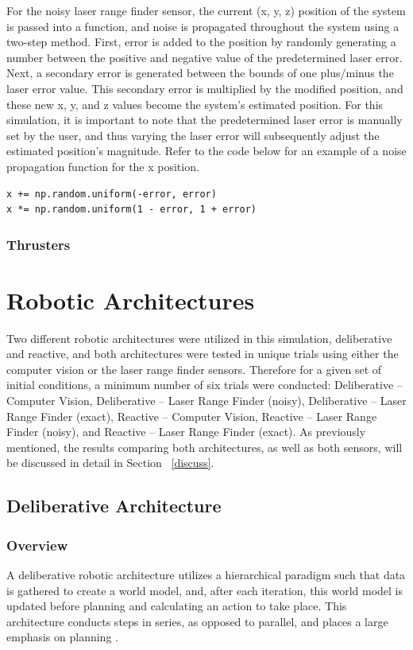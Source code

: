 \documentclass[journal, 10pt]{IEEEtran}
\begin{document}
For the noisy laser range finder sensor, the current (x, y, z) position of the system is passed into a function, and noise is propagated throughout the system using a two-step method. First, error is added to the position by randomly generating a number between the positive and negative value of the predetermined laser error. Next, a secondary error is generated between the bounds of one plus/minus the laser error value. This secondary error is multiplied by the modified position, and these new x, y, and z values become the system's estimated position.  For this simulation, it is important to note that the predetermined laser error is manually set by the user, and thus varying the laser error will subsequently adjust the estimated position's magnitude. Refer to the code below for an example of a noise propagation function for the x position.

\begin{verbatim}
x += np.random.uniform(-error, error) 
x *= np.random.uniform(1 - error, 1 + error)
\end{verbatim}

\subsubsection{Thrusters}


\section{Robotic Architectures}
Two different robotic architectures were utilized in this simulation, deliberative and reactive, and both architectures were tested in unique trials using either the computer vision or the laser range finder sensors. Therefore for a given set of initial conditions, a minimum number of six trials were conducted: Deliberative -- Computer Vision, Deliberative -- Laser Range Finder (noisy), Deliberative -- Laser Range Finder (exact), Reactive -- Computer Vision, Reactive -- Laser Range Finder (noisy), and Reactive -- Laser Range Finder (exact). As previously mentioned, the results comparing both architectures, as well as both sensors, will be discussed in detail in Section ~\ref{discuss}.

\subsection{Deliberative Architecture}
\subsubsection{Overview}
A deliberative robotic architecture utilizes a hierarchical paradigm such that data is gathered to create a world model, and, after each iteration, this world model is updated before planning and calculating an action to take place. This architecture conducts steps in series, as opposed to parallel, and places a large emphasis on planning \cite{joshi}.
\end{document}
